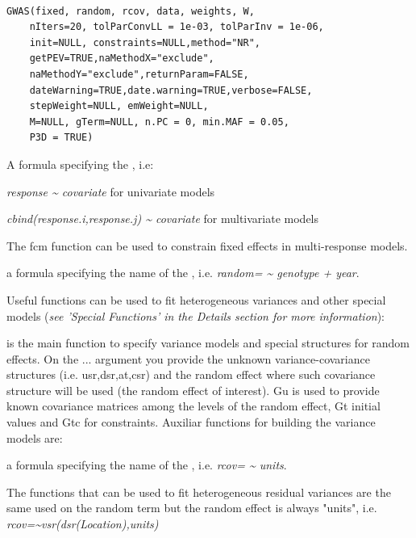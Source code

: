 \documentclass[a4paper]{book}
\begin{document}
%
\begin{Usage}
\begin{verbatim}

GWAS(fixed, random, rcov, data, weights, W,
    nIters=20, tolParConvLL = 1e-03, tolParInv = 1e-06, 
    init=NULL, constraints=NULL,method="NR", 
    getPEV=TRUE,naMethodX="exclude",
    naMethodY="exclude",returnParam=FALSE, 
    dateWarning=TRUE,date.warning=TRUE,verbose=FALSE,
    stepWeight=NULL, emWeight=NULL,
    M=NULL, gTerm=NULL, n.PC = 0, min.MAF = 0.05, 
    P3D = TRUE)
\end{verbatim}
\end{Usage}
%
\begin{Arguments}
\begin{ldescription}
\item[\code{fixed}] A formula specifying the  , i.e:

\emph{response \textasciitilde{} covariate} for univariate models

\emph{cbind(response.i,response.j) \textasciitilde{} covariate} for multivariate models

The fcm function can be used to constrain fixed effects in multi-response models.



\item[\code{random}] a formula specifying the name of the , i.e. \emph{random= \textasciitilde{} genotype + year}.

Useful functions can be used to fit heterogeneous variances and other special models (\emph{see 'Special Functions' in the Details section for more information}):

 is the main function to specify variance models and special structures for random effects. On the ... argument you provide the unknown variance-covariance structures (i.e. usr,dsr,at,csr) and the random effect where such covariance structure will be used (the random effect of interest). Gu is used to provide known covariance matrices among the levels of the random effect, Gt initial values and Gtc for constraints. Auxiliar functions for building the variance models are:


\item[\code{rcov}] a formula specifying the name of the , i.e. \emph{rcov= \textasciitilde{} units}.

The functions that can be used to fit heterogeneous residual variances are the same used on the random term but the random effect is always "units", i.e. \emph{rcov=\textasciitilde{}vsr(dsr(Location),units)}



\end{ldescription}
\end{Arguments}
\end{document}
